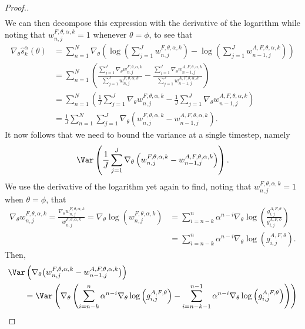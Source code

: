 \begin{proof}[Proof.]
\begin{eqnarray}
\end{eqnarray}
We can then decompose this expression with the derivative of the logarithm while noting that $w_{n,j}^{F,\theta,\alpha,k} = 1$ whenever $\theta=\phi$, to see that
\begin{align}
    \nabla_\theta \hat s_k^\alpha(\theta) 
    &= \sum_{n=1}^N \nabla_\theta \left(\log\left(\sum_{j=1}^J w_{n,j}^{F,\theta,\alpha,k}\right)-\log\left(\sum_{j=1}^J w_{n-1,j}^{A, F,\theta, \alpha, k}\right)\right) \\
    &= \sum_{n=1}^N \left(\frac{\sum_{j=1}^J \nabla_\theta w_{n,j}^{F,\theta,\alpha,k}}{\sum_{j=1}^J w_{n,j}^{F,\theta,\alpha,k}}-\frac{\sum_{j=1}^J \nabla_\theta w_{n-1,j}^{A,F,\theta,\alpha, k}}{\sum_{j=1}^J w_{n-1,j}^{A,F,\theta,\alpha, k}}\right) \\
    &= \sum_{n=1}^N \left(\frac{1}{J}\sum_{j=1}^J \nabla_\theta w_{n,j}^{F,\theta,\alpha,k}-\frac{1}{J}\sum_{j=1}^J \nabla_\theta w_{n-1,j}^{A,F,\theta,\alpha, k}\right)\\
    &= \frac{1}{J}\sum_{n=1}^N \sum_{j=1}^J \nabla_\theta \left(w_{n,j}^{F,\theta,\alpha,k}- w_{n-1,j}^{A,F,\theta,\alpha, k}\right).
\end{align}
It now follows that we need to bound the variance at a single timestep, namely
\begin{equation}
\Var\left(\frac{1}{J}\sum_{j=1}^J\nabla_\theta \left(w_{n,j}^{F,\theta,\alpha,k}- w_{n-1,j}^{A,F,\theta,\alpha, k}\right)\right).
\end{equation}
We use the derivative of the logarithm yet again to find, noting that $w_{n,j}^{F,\theta,\alpha,k}=1$ when $\theta=\phi$, that
\begin{align}
    \nabla_\theta w_{n,j}^{F,\theta,\alpha,k} = \frac{\nabla_\theta w_{n,j}^{F,\theta,\alpha,k}}{w_{n,j}^{F,\theta,\alpha,k}} = \nabla_\theta \log(w_{n,j}^{F,\theta,\alpha,k}) &= \sum_{i=n-k}^n \alpha^{n-i} \nabla_\theta \log\left(\frac{g_{i,j}^{A,F,\theta}}{g_{i,j}^{A,F,\phi}} \right) 
    \\
    &= \sum_{i=n-k}^n \alpha^{n-i} \nabla_\theta \log\left(g_{i,j}^{A,F,\theta}\right).
\end{align}
Then,
\begin{align}
    &\Var\left(\nabla_\theta \big(w_{n,j}^{F,\theta,\alpha,k}- w_{n-1,j}^{A,F,\theta,\alpha, k}\big)\right) 
    \\
    &\qquad = \Var\left(\nabla_\theta \left(\sum_{i=n-k}^n \alpha^{n-i} \nabla_\theta \log\left(g_{i,j}^{A,F,\theta}\right)- \sum_{i=n-k-1}^{n-1} \alpha^{n-i} \nabla_\theta \log\left(g_{i,j}^{A,F,\theta}\right)\right)\right) \\

\end{align}
\end{proof}
